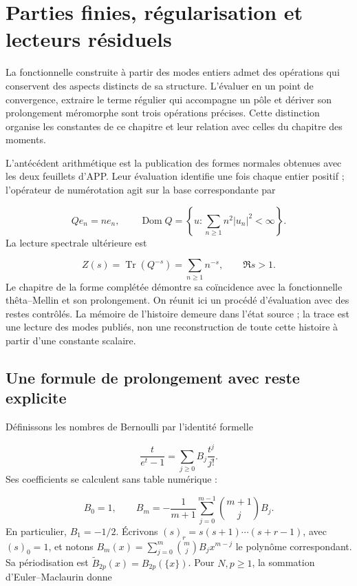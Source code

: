 \section{Parties finies, régularisation et lecteurs résiduels}
\label{viii:lectura:manuscrito-04}
La fonctionnelle construite à partir des modes entiers admet des opérations qui conservent des aspects distincts de sa structure. L’évaluer en un point de convergence, extraire le terme régulier qui accompagne un pôle et dériver son prolongement méromorphe sont trois opérations précises. Cette distinction organise les constantes de ce chapitre et leur relation avec celles du chapitre des moments.

L'antécédent arithmétique est la publication des formes normales obtenues avec les deux feuillets d'APP. Leur évaluation identifie une fois chaque entier positif ; l'opérateur de numérotation agit sur la base correspondante par

\[
Qe_n=ne_n,\qquad
\operatorname{Dom}Q=\left\{u:\sum_{n\geq1}n^2|u_n|^2<\infty\right\}.
\]
La lecture spectrale ultérieure est

\[
Z(s)=\operatorname{Tr}(Q^{-s})=\sum_{n\geq1}n^{-s},\qquad \Re s>1.
\]
Le chapitre de la forme complétée démontre sa coïncidence avec la fonctionnelle thêta–Mellin et son prolongement. On réunit ici un procédé d’évaluation avec des restes contrôlés. La mémoire de l’histoire demeure dans l’état source ; la trace est une lecture des modes publiés, non une reconstruction de toute cette histoire à partir d’une constante scalaire.

\subsection{Une formule de prolongement avec reste explicite}
Définissons les nombres de Bernoulli par l’identité formelle

\[
\frac{t}{e^t-1}=\sum_{j\geq0}B_j\frac{t^j}{j!}.
\]
Ses coefficients se calculent sans table numérique :

\[
B_0=1,\qquad
B_m=-\frac1{m+1}\sum_{j=0}^{m-1}\binom{m+1}{j}B_j.
\]
En particulier, \(B_1=-1/2\). Écrivons \((s)_r=s(s+1)\cdots(s+r-1)\), avec \((s)_0=1\), et notons \(B_m(x)=\sum_{j=0}^m\binom mjB_jx^{m-j}\) le polynôme correspondant. Sa périodisation est \(\widetilde B_{2p}(x)=B_{2p}(\{x\})\). Pour \(N,p\geq1\), la sommation d’Euler–Maclaurin donne

